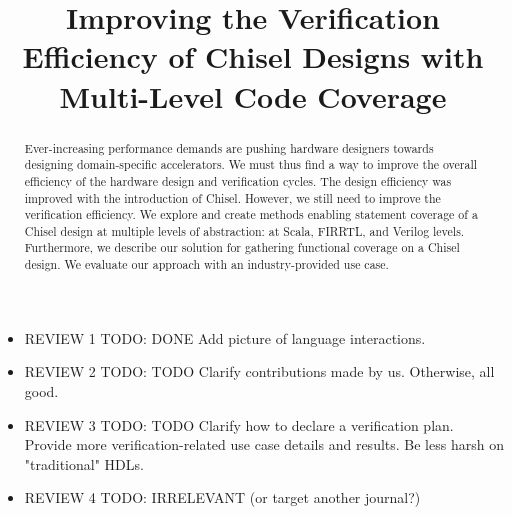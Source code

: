 \documentclass[runningheads]{llncs}
\newcommand{\todo}[1]{{\color{olive} TODO: #1}}
\begin{document}
%
\title{Improving the Verification Efficiency of Chisel Designs with Multi-Level Code Coverage}
%
%
%

%
%
\maketitle              %
%
\begin{abstract}
Ever-increasing performance demands are pushing hardware designers towards designing domain-specific accelerators. We must thus find a way to improve the overall efficiency of the hardware design and verification cycles. The design efficiency was improved with the introduction of Chisel. However, we still need to improve the verification efficiency.
We explore and create methods enabling statement coverage of a Chisel design at multiple levels of abstraction: at Scala, FIRRTL, and Verilog levels. Furthermore, we describe our solution for gathering functional coverage on a Chisel design.
We evaluate our approach with an industry-provided use case.

\end{abstract}

\begin{itemize}
    \item REVIEW 1 \todo{DONE} Add picture of language interactions.
    \item REVIEW 2 \todo{TODO} Clarify contributions made by us. Otherwise, all good.
    \item REVIEW 3 \todo{TODO} Clarify how to declare a verification plan. Provide more verification-related use case details and results. Be less harsh on "traditional" HDLs.
    \item REVIEW 4 \todo{IRRELEVANT (or target another journal?)}
\end{itemize}
\end{document}
